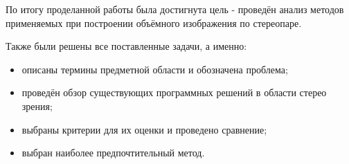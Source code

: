 По итогу проделанной работы была достигнута цель - проведён анализ методов применяемых при построении объёмного изображения по стереопаре.

Также были решены все поставленные задачи, а именно:

\begin{itemize}
	\item описаны термины предметной области и обозначена проблема;
	\item проведён обзор существующих программных решений в области стерео зрения;
	\item выбраны критерии для их оценки и проведено сравнение;
	\item выбран наиболее предпочтительный метод.
\end{itemize}